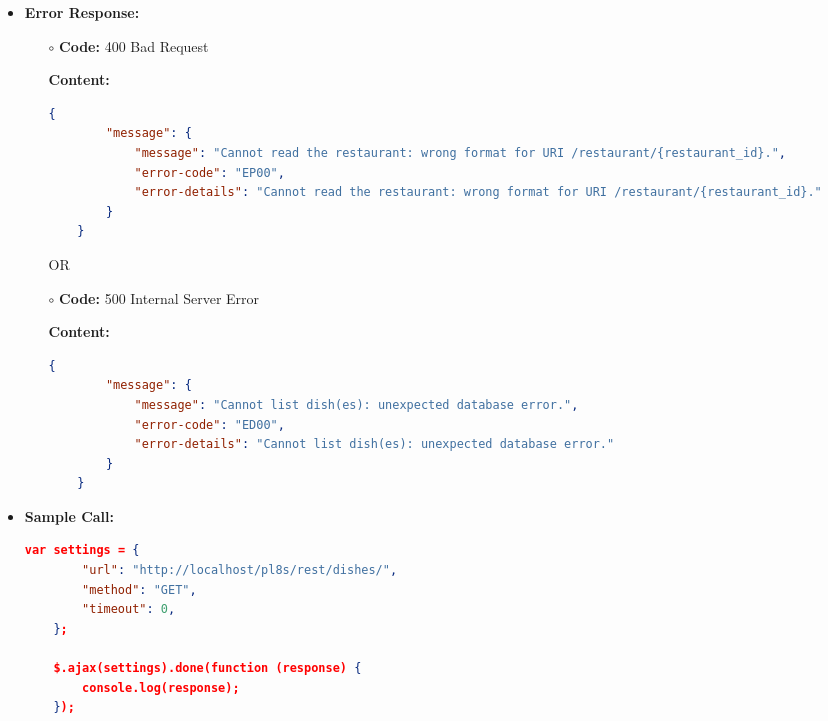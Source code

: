 \begin{itemize}
    \item \textbf{Error Response:}
    	\begin{itemize}
			\item[$\circ$] \textbf{Code:} 400 Bad Request
			\item[] \textbf{Content:}
			\begin{lstlisting}[language=json]
	{
		"message": {
			"message": "Cannot read the restaurant: wrong format for URI /restaurant/{restaurant_id}.",
			"error-code": "EP00",
			"error-details": "Cannot read the restaurant: wrong format for URI /restaurant/{restaurant_id}."
		}
	}
			\end{lstlisting}
OR
			\item[$\circ$] \textbf{Code:} 500 Internal Server Error
			\item[] \textbf{Content:}
			\begin{lstlisting}[language=json]
	{
		"message": {
			"message": "Cannot list dish(es): unexpected database error.",
			"error-code": "ED00",
			"error-details": "Cannot list dish(es): unexpected database error."
		}
	}
			\end{lstlisting}
		\end{itemize}
	\item \textbf{Sample Call:}
	\medskip
	\begin{lstlisting}[language=json]
	var settings = {
		"url": "http://localhost/pl8s/rest/dishes/",
		"method": "GET",
		"timeout": 0,
	};
	
	$.ajax(settings).done(function (response) {
		console.log(response);
	});
	\end{lstlisting}
	
\end{itemize}
